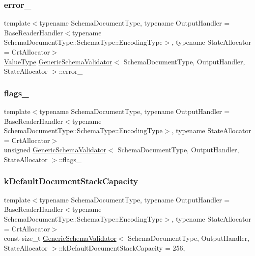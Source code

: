 \subsubsection{\texorpdfstring{error\+\_\+}{error\_}}
{\footnotesize\ttfamily template$<$typename Schema\+Document\+Type, typename Output\+Handler = Base\+Reader\+Handler$<$typename Schema\+Document\+Type\+::\+Schema\+Type\+::\+Encoding\+Type$>$, typename State\+Allocator = Crt\+Allocator$>$ \\
\hyperlink{classGenericSchemaValidator_a435890a2dddeecb896d4ac76de03ca68}{Value\+Type} \hyperlink{classGenericSchemaValidator}{Generic\+Schema\+Validator}$<$ Schema\+Document\+Type, Output\+Handler, State\+Allocator $>$\+::error\+\_\+\hspace{0.3cm}{\ttfamily [private]}}

\mbox{\label{classGenericSchemaValidator_ab56d66840b9f7afe8a806e31afa10a10}} 
\subsubsection{\texorpdfstring{flags\+\_\+}{flags\_}}
{\footnotesize\ttfamily template$<$typename Schema\+Document\+Type, typename Output\+Handler = Base\+Reader\+Handler$<$typename Schema\+Document\+Type\+::\+Schema\+Type\+::\+Encoding\+Type$>$, typename State\+Allocator = Crt\+Allocator$>$ \\
unsigned \hyperlink{classGenericSchemaValidator}{Generic\+Schema\+Validator}$<$ Schema\+Document\+Type, Output\+Handler, State\+Allocator $>$\+::flags\+\_\+\hspace{0.3cm}{\ttfamily [private]}}

\mbox{\label{classGenericSchemaValidator_a0052a86778575179422064167a95c405}} 
\subsubsection{\texorpdfstring{k\+Default\+Document\+Stack\+Capacity}{kDefaultDocumentStackCapacity}}
{\footnotesize\ttfamily template$<$typename Schema\+Document\+Type, typename Output\+Handler = Base\+Reader\+Handler$<$typename Schema\+Document\+Type\+::\+Schema\+Type\+::\+Encoding\+Type$>$, typename State\+Allocator = Crt\+Allocator$>$ \\
const size\+\_\+t \hyperlink{classGenericSchemaValidator}{Generic\+Schema\+Validator}$<$ Schema\+Document\+Type, Output\+Handler, State\+Allocator $>$\+::k\+Default\+Document\+Stack\+Capacity = 256\hspace{0.3cm}{\ttfamily [static]}, {\ttfamily [private]}}

